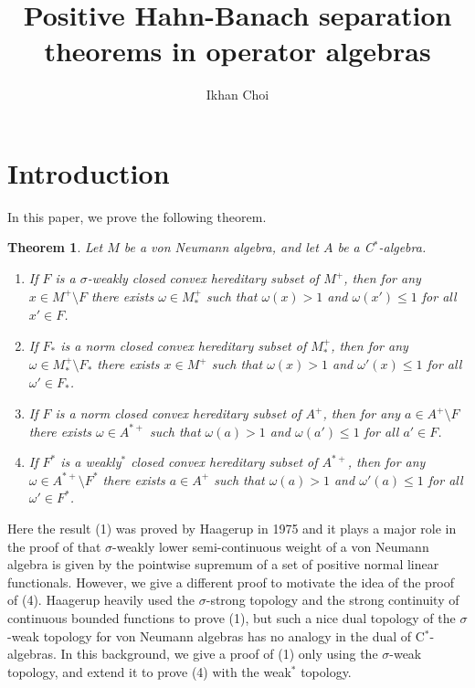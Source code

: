 \documentclass[noamsfonts,a4paper,10pt]{amsart}
\title{Positive Hahn-Banach separation theorems in operator algebras}
\author{Ikhan Choi}
\theoremstyle{plain}
\newtheorem*{thm*}{Theorem}
\theoremstyle{definition}
\theoremstyle{remark}
\begin{document}
\begin{abstract}

\end{abstract}

\maketitle

\section{Introduction}

In this paper, we prove the following theorem.
\begin{thm*}
Let $M$ be a von Neumann algebra, and let $A$ be a C$^*$-algebra.
\begin{enumerate}
\item If $F$ is a $\sigma$-weakly closed convex hereditary subset of $M^+$, then for any $x\in M^+\setminus F$ there exists $\omega\in M_*^+$ such that $\omega(x)>1$ and $\omega(x')\le1$ for all $x'\in F$.
\item If $F_*$ is a norm closed convex hereditary subset of $M_*^+$, then for any $\omega\in M_*^+\setminus F_*$ there exists $x\in M^+$ such that $\omega(x)>1$ and $\omega'(x)\le1$ for all $\omega'\in F_*$.
\item If $F$ is a norm closed convex hereditary subset of $A^+$, then for any $a\in A^+\setminus F$\quad there exists $\omega\in A^{*+}$ such that $\omega(a)>1$ and $\omega(a')\le1$ for all $a'\in F$.
\item If $F^*$ is a weakly$^*$ closed convex hereditary subset of $A^{*+}$, then for any $\omega\in A^{*+}\setminus F^*$ there exists $a\in A^+$ such that $\omega(a)>1$ and $\omega'(a)\le1$ for all $\omega'\in F^*$.
\end{enumerate}
\end{thm*}

Here the result (1) was proved by Haagerup in 1975 and it plays a major role in the proof of that $\sigma$-weakly lower semi-continuous weight of a von Neumann algebra is given by the pointwise supremum of a set of positive normal linear functionals.
However, we give a different proof to motivate the idea of the proof of (4).
Haagerup heavily used the $\sigma$-strong topology and the strong continuity of continuous bounded functions to prove (1), but such a nice dual topology of the $\sigma$-weak topology for von Neumann algebras has no analogy in the dual of C$^*$-algebras.
In this background, we give a proof of (1) only using the $\sigma$-weak topology, and extend it to prove (4) with the weak$^*$ topology.
\end{document}
